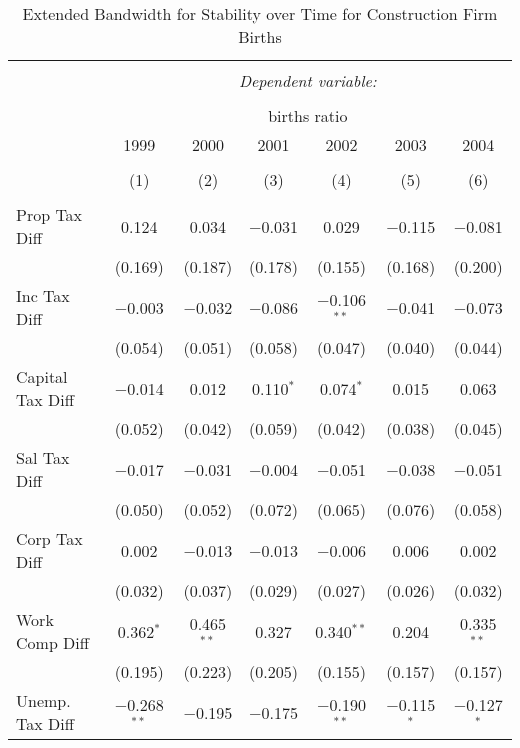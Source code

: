 
\begin{table}[!htbp] \centering 
  \caption{Extended Bandwidth for Stability over Time for  Construction Firm Births} 
  \label{23 ebyear} 
\small 
\begin{tabular}{@{\extracolsep{5pt}}lcccccc} 
\\[-1.8ex]\hline 
\hline \\[-1.8ex] 
 & \multicolumn{6}{c}{\textit{Dependent variable:}} \\ 
\cline{2-7} 
\\[-1.8ex] & \multicolumn{6}{c}{births ratio} \\ 
 & 1999 & 2000 & 2001 & 2002 & 2003 & 2004 \\ 
\\[-1.8ex] & (1) & (2) & (3) & (4) & (5) & (6)\\ 
\hline \\[-1.8ex] 
 Prop Tax Diff & 0.124 & 0.034 & $-$0.031 & 0.029 & $-$0.115 & $-$0.081 \\ 
  & (0.169) & (0.187) & (0.178) & (0.155) & (0.168) & (0.200) \\ 
  Inc Tax Diff & $-$0.003 & $-$0.032 & $-$0.086 & $-$0.106$^{**}$ & $-$0.041 & $-$0.073 \\ 
  & (0.054) & (0.051) & (0.058) & (0.047) & (0.040) & (0.044) \\ 
  Capital Tax Diff & $-$0.014 & 0.012 & 0.110$^{*}$ & 0.074$^{*}$ & 0.015 & 0.063 \\ 
  & (0.052) & (0.042) & (0.059) & (0.042) & (0.038) & (0.045) \\ 
  Sal Tax Diff & $-$0.017 & $-$0.031 & $-$0.004 & $-$0.051 & $-$0.038 & $-$0.051 \\ 
  & (0.050) & (0.052) & (0.072) & (0.065) & (0.076) & (0.058) \\ 
  Corp Tax Diff & 0.002 & $-$0.013 & $-$0.013 & $-$0.006 & 0.006 & 0.002 \\ 
  & (0.032) & (0.037) & (0.029) & (0.027) & (0.026) & (0.032) \\ 
  Work Comp Diff & 0.362$^{*}$ & 0.465$^{**}$ & 0.327 & 0.340$^{**}$ & 0.204 & 0.335$^{**}$ \\ 
  & (0.195) & (0.223) & (0.205) & (0.155) & (0.157) & (0.157) \\ 
  Unemp. Tax Diff & $-$0.268$^{**}$ & $-$0.195 & $-$0.175 & $-$0.190$^{**}$ & $-$0.115$^{*}$ & $-$0.127$^{*}$ \\ 

\end{tabular}
\end{table}
